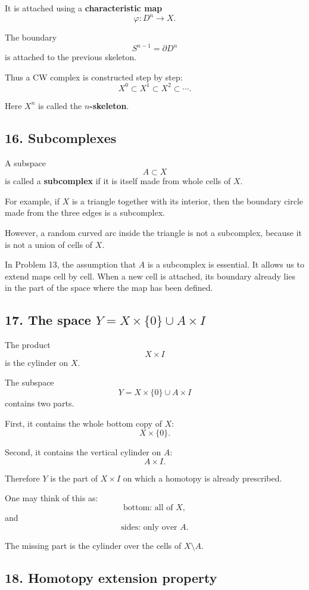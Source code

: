 \documentclass[12pt,a4paper]{article}
\theoremstyle{notespace}
\begin{document}
It is attached using a \textbf{characteristic map}
\[
\varphi:D^n\to X.
\]

The boundary
\[
S^{n-1}=\partial D^n
\]
is attached to the previous skeleton.

Thus a CW complex is constructed step by step:
\[
X^0\subset X^1\subset X^2\subset\cdots.
\]

Here \(X^n\) is called the \textbf{\(n\)-skeleton}.

\subsection*{16. Subcomplexes}

A subspace
\[
A\subset X
\]
is called a \textbf{subcomplex} if it is itself made from whole cells of \(X\).

For example, if \(X\) is a triangle together with its interior, then the boundary circle made from the three edges is a subcomplex.

However, a random curved arc inside the triangle is not a subcomplex, because it is not a union of cells of \(X\).

In Problem 13, the assumption that \(A\) is a subcomplex is essential. It allows us to extend maps cell by cell. When a new cell is attached, its boundary already lies in the part of the space where the map has been defined.

\subsection*{17. The space \(Y=X\times\{0\}\cup A\times I\)}

The product
\[
X\times I
\]
is the cylinder on \(X\).

The subspace
\[
Y=X\times\{0\}\cup A\times I
\]
contains two parts.

First, it contains the whole bottom copy of \(X\):
\[
X\times\{0\}.
\]

Second, it contains the vertical cylinder on \(A\):
\[
A\times I.
\]

Therefore \(Y\) is the part of \(X\times I\) on which a homotopy is already prescribed.

One may think of this as:
\[
\text{bottom: all of }X,
\]
and
\[
\text{sides: only over }A.
\]

The missing part is the cylinder over the cells of \(X\setminus A\).

\subsection*{18. Homotopy extension property}
\end{document}
